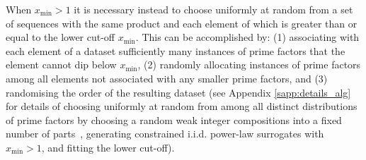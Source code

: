\documentclass[%
prx,
reprint,
superscriptaddress,
nofootinbib,
 amsmath,amssymb,
 aps,
floatfix,
]{revtex4-2}
\begin{document}
When $x_{\min} > 1$ it is necessary instead to choose uniformly at random from a set of sequences with the same product and each element of which is greater than or equal to the lower cut-off $x_{\min}$. This can be accomplished by: (1) associating with each element of a dataset sufficiently many instances of prime factors that the element cannot dip below $x_{\min}$, (2) randomly allocating instances of prime factors among all elements not associated with any smaller prime factors, and (3) randomising the order of the resulting dataset (see Appendix \ref{sapp:details_alg} for details of {choosing uniformly at random from among all distinct distributions of prime factors by choosing a random weak integer compositions into a fixed number of parts~\cite{nijenhuis2014combinatorial},} generating constrained i.i.d. power-law surrogates with $x_{\min} > 1${,} and fitting the lower cut-off).  
\end{document}
